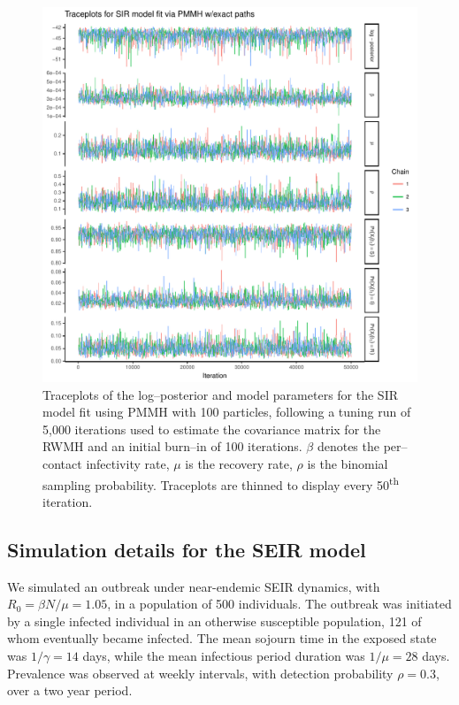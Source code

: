 \begin{figure}[htbp]
	\centering
	\includegraphics[width=0.9\linewidth]{figures/sir_pomp_exact_traceplots}
	\caption[Simulation 1 MCMC traceplots for an SIR model fit using PMMH with exact particle paths.]{Traceplots of the log--posterior and model parameters for the SIR model fit using PMMH with 100 particles, following a tuning run of 5,000 iterations used to estimate the covariance matrix for the RWMH and an initial burn--in of 100 iterations. $ \beta $ denotes the per--contact infectivity rate, $ \mu $ is the recovery rate, $ \rho $ is the binomial sampling probability. Traceplots are thinned to display every 50\textsuperscript{th} iteration.}
	\label{fig:sirpompexacttraceplots}
\end{figure}

\newpage
\subsection{Simulation details for the SEIR model}
\label{subsec:bda_seir_sim1_details}
We simulated an outbreak under near-endemic SEIR dynamics, with $ R_0 = \beta N / \mu = 1.05 $, in a population of 500 individuals. The outbreak was initiated by a single infected individual in an otherwise susceptible population, 121 of whom eventually became infected. The mean sojourn time in the exposed state was $ 1/\gamma = 14 $ days, while the mean infectious period duration was $ 1/\mu = 28$ days. Prevalence was observed at weekly intervals, with detection probability $ \rho = 0.3 $, over a two year period.

